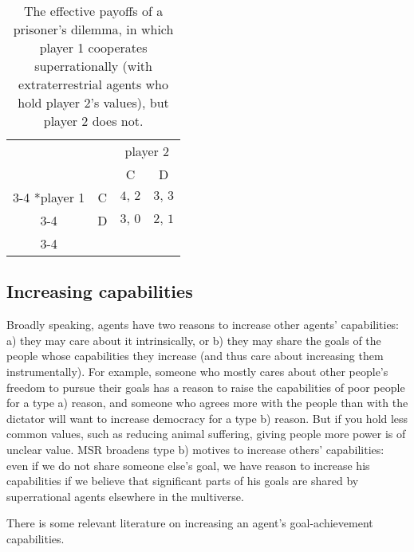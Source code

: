 \renewcommand{\arraystretch}{1.5}
\begin{table}[h!]
    \centering
    \setlength{\extrarowheight}{2pt}
    \begin{tabular}{cc|c|c|}
      & \multicolumn{1}{c}{} & \multicolumn{2}{c}{player 2}\\
      & \multicolumn{1}{c}{} & \multicolumn{1}{c}{C}  & \multicolumn{1}{c}{D} \\\cline{3-4}
      \multirow{2}*{player 1}  & C & $4,\, 2$ & $3,\, 3$ \\\cline{3-4}
      & D & $3,\, 0$ & $2,\, 1$ \\\cline{3-4}
    \end{tabular}
    \caption{The effective payoffs
of a prisoner's dilemma, in which player 1 cooperates superrationally
(with extraterrestrial agents who hold player 2's values), but player 2
does not.}
    \label{PD-payoff-matrix-superrational-prisoner}
\end{table}

\hypertarget{increasing-capabilities}{\subsection{Increasing
capabilities}\label{increasing-capabilities}}

Broadly speaking, agents have two reasons to increase other agents'
capabilities: a) they may care about it intrinsically, or b) they may
share the goals of the people whose capabilities they increase (and thus
care about increasing them instrumentally). For example, someone who
mostly cares about other people's freedom to pursue their goals has a
reason to raise the capabilities of poor people for a type a) reason,
and someone who agrees more with the people than with the dictator will
want to increase democracy for a type b) reason. But if you hold less
common values, such as reducing animal suffering, giving people more
power is of unclear value. MSR broadens type b) motives to increase
others' capabilities: even if we do not share someone else's goal, we
have reason to increase his capabilities if we believe that significant
parts of his goals are shared by superrational agents elsewhere in the
multiverse.

There is some relevant literature on increasing an agent's
goal-achievement capabilities.

